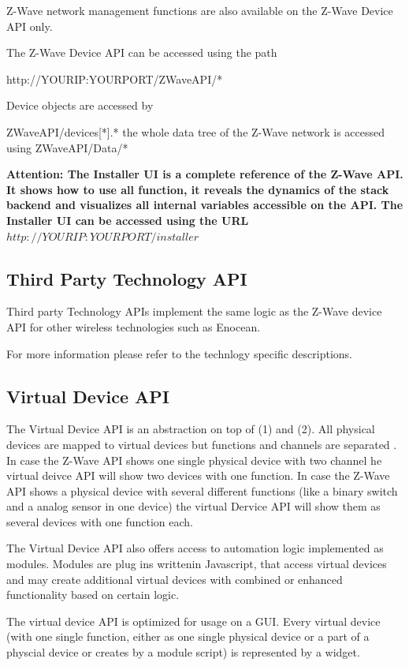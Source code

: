 Z-Wave network management functions are also available on the Z-Wave Device API only.

The Z-Wave Device API can be accessed using the path 

http://YOURIP:YOURPORT/ZWaveAPI/*

Device objects are accessed by 

ZWaveAPI/devices[*].* the whole data tree of the Z-Wave network is accessed using  ZWaveAPI/Data/*

\textbf{Attention: The Installer UI is a complete reference of the Z-Wave API. It shows how 
to use all function, it reveals the dynamics of the stack backend and visualizes all 
internal variables accessible on the API. The Installer UI can be accessed using the 
URL $http://YOURIP:YOURPORT/installer$}

\subsection{Third Party Technology API}

Third party Technology APIs implement the same logic as the Z-Wave device API for other 
wireless technologies such as Enocean.

For more information  please refer to the technlogy specific descriptions.

\subsection{Virtual Device API}

The Virtual Device API is an abstraction on top of (1) and (2). All physical devices 
are mapped to virtual devices but functions and channels are separated . In case the 
Z-Wave API shows one single physical device with two channel he virtual deivce API will 
show two devices with one function. In case the Z-Wave API shows a physical device with 
several different functions (like a binary switch and a analog sensor in one device) the 
virtual Dervice API will show them as several devices with one function each.

The Virtual Device API also offers access to automation logic implemented as modules.
Modules are plug ins writtenin Javascript, that access virtual devices and may create 
additional virtual devices with combined  or enhanced functionality based on certain logic.

The virtual device API is optimized for usage on a GUI. Every virtual device (with one 
single function, either as one single physical device or a part of a physcial device or 
creates by a module script) is represented by a widget. 


